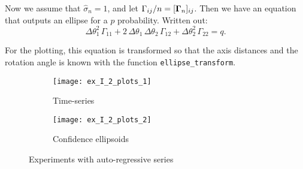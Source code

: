 Now we assume that $\hat{\sigma}_n=1$, and let $\Gamma_{ij}/n = [\boldsymbol{\mathrm{\Gamma}}_n]_{ij}$. Then we have an equation that outputs an ellipse for a $p$ probability.
Written out:
\begin{equation}
	\Delta\theta_1^2\,\Gamma_{11} + 2\,\Delta\theta_1\,\Delta\theta_2\,\Gamma_{12} + \Delta\theta_2^2\,\Gamma_{22} = q.
\end{equation}

For the plotting, this equation is transformed so that the axis distances and the rotation 
angle is known with the function \verb|ellipse_transform|\cite{ellipse}.

\begin{figure}[H]
	\centering
	\begin{subfigure}[b]{.49\textwidth}
		\centering
		\texttt{[image: ex\_I\_2\_plots\_1]}
		\caption{Time-series}
		\label{fig:ex_I_2_plots_1}
	\end{subfigure}\hfill
	\begin{subfigure}[b]{.49\textwidth}
		\centering
		\texttt{[image: ex\_I\_2\_plots\_2]}
		\caption{Confidence ellipsoids}
		\label{fig:ex_I_2_plots_2}
	\end{subfigure}
	\caption{Experiments with auto-regressive series}
\end{figure}

